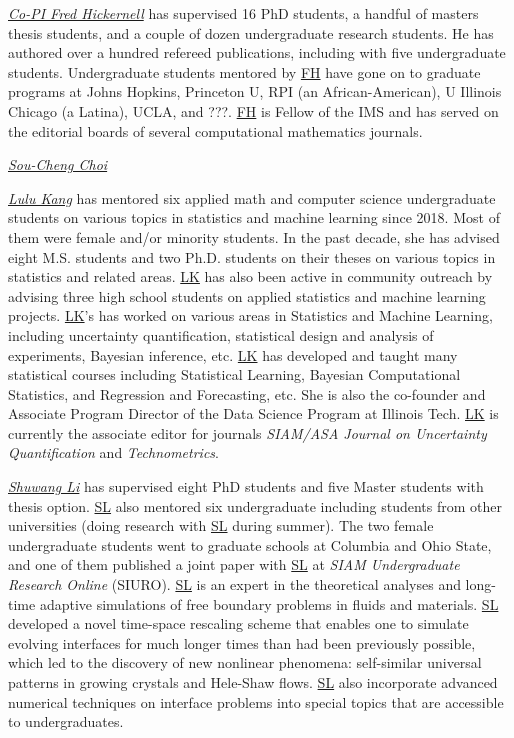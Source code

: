 \documentclass[11pt]{NSFamsart}
\newcommand{\FH}{\hyperlink{FHlink}{FH}\xspace}
\newcommand{\LK}{\hyperlink{LKlink}{LK}\xspace}
\newcommand{\SL}{\hyperlink{SLlink}{SL}\xspace}
\begin{document}
\noindent \underline{\textit{Co-PI Fred Hickernell}} has supervised 16 PhD students, a handful of masters thesis students, and a couple of dozen undergraduate research students.  He has authored over a hundred refereed publications, including \cite{ChoEtal22a,HicEtal14b,LiHic03a,SonRidFasHic10a} with five undergraduate students.  Undergraduate students mentored by \FH have gone on to graduate programs at Johns Hopkins, Princeton U, RPI (an African-American), U Illinois Chicago (a Latina), UCLA, and ???.  \FH is Fellow of the IMS and has served on the editorial boards of several computational mathematics journals. 

\noindent\underline{\textit{Sou-Cheng Choi}} 

\noindent \underline{\textit{Lulu Kang}} has mentored six applied math and computer science undergraduate students on various topics in statistics and machine learning since 2018. Most of them were female and/or minority students. In the past decade, she has advised eight M.S. students and two Ph.D. students on their theses on various topics in statistics and related areas. \LK has also been active in community outreach by advising three high school students on applied statistics and machine learning projects. 
\LK’s has worked on various areas in Statistics and Machine Learning, including uncertainty quantification, statistical design and analysis of experiments, Bayesian inference, etc. 
\LK has developed and taught many statistical courses including Statistical Learning, Bayesian Computational Statistics, and Regression and Forecasting, etc. She is also the co-founder and Associate Program Director of the Data Science Program at Illinois Tech. \LK is currently the associate editor for journals \emph{SIAM/ASA Journal on Uncertainty Quantification} and \emph{Technometrics}.

\noindent \underline{\textit{Shuwang Li}} has supervised eight PhD students and five Master students with thesis option. \SL also mentored six undergraduate including students from other universities (doing research with \SL during summer). The two female undergraduate students went to graduate schools at Columbia and Ohio State,  and one of them published a joint paper with \SL at {\it SIAM Undergraduate Research Online} (SIURO). 
\SL is an expert in the theoretical analyses and
long-time adaptive simulations of free boundary problems in  fluids and
materials. \SL developed a novel time-space
rescaling scheme that enables one to simulate evolving interfaces for much
longer times than had been previously possible, which led to the discovery of new nonlinear
phenomena: self-similar universal patterns in growing crystals and Hele-Shaw  flows. \SL also incorporate advanced numerical techniques on interface problems into special topics that are accessible to undergraduates. 
\end{document}
